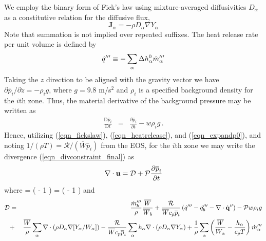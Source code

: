 \documentclass[11pt]{book}
\begin{document}
We employ the binary form of Fick's law using mixture-averaged diffusivities $D_\alpha$ as a constitutive relation for the diffusive flux,
\begin{equation}
\label{eqn_fickslaw}
\mathbf{J}_{\alpha} = - \rho D_\alpha \nabla Y_\alpha
\end{equation}
Note that summation is not implied over repeated suffixes.
The heat release rate per unit volume is defined by
\begin{equation}
\label{eqn_heatrelease}
\dot{q}^{\prime\prime\prime} \equiv -\sum_\alpha \Delta h^0_\alpha \dot{m}_{\alpha}^{\prime\prime\prime}
\end{equation}
Taking the $z$ direction to be aligned with the gravity vector we have $\partial \overline{p}_i/\partial z = -\rho_i g$, where $g = 9.8$ m/s$^2$ and $\rho_i$ is a specified background density for the $i$th zone.
Thus, the material derivative of the background pressure may be written as
\begin{eqnarray}
\label{eqn_expandp0}
\frac{\mbox{D}\overline{p}_i}{\mbox{D}t} &=& \frac{\partial \overline{p}_i}{\partial t} - w \rho_i g \,\mbox{.}
\end{eqnarray}
Hence, utilizing (\ref{eqn_fickslaw}), (\ref{eqn_heatrelease}), and (\ref{eqn_expandp0}), and noting $1/(\rho T) = \mathcal{R}/(\overline{W} \overline{p}_i)$ from the EOS,
for the $i$th zone we may write the divergence (\ref{eqn_divconstraint_final}) as
\begin{equation}
\label{eqn_fds_divcontraint}
\nabla\cdot \mathbf{u} = \mathcal{D} + \mathcal{P} \frac{\partial \overline{p}_i}{\partial t}
\end{equation}
where
\be
\label{eqn_fdsP}
 = \left(  - 1 \right) = \left(  - 1 \right)
\ee
and
\begin{eqnarray}
\label{eqn_fdsD}
\mathcal{D} &=& \frac{\dot{m}_b^\tripleprime}{\rho} \frac{\overline{W}}{\overline{W}_b} + \frac{\mathcal{R}}{\overline{W} c_p \overline{p}_i} \left( \dot{q}^\tripleprime - \dq_b'''
- \Div \dot{\mathbf{q}}^{\prime\prime} \right) - \mathcal{P} w \rho_i g \nonumber \vspace{0.3cm} \\
&+& \frac{\overline{W}}{\rho} \sum_\alpha \Div \left( \rho D_\alpha \nabla[Y_\alpha/W_\alpha] \right) -
\frac{\mathcal{R}}{\overline{W}c_p \overline{p}_i} \sum_\alpha h_{\alpha} \Div\left( \rho D_\alpha \nabla Y_\alpha \right)
+ \frac{1}{\rho} \sum_\alpha \left( \frac{\overline{W}}{W_\alpha} - \frac{h_{\alpha}}{c_p T} \right) \dot{m}_{\alpha}^\tripleprime
\end{eqnarray}
\end{document}
